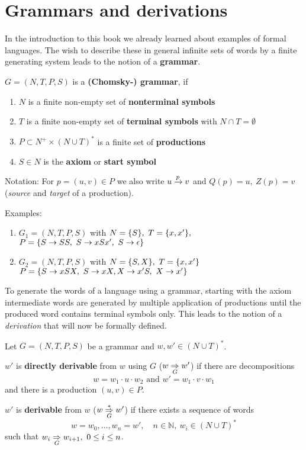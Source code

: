 \section{Grammars and derivations}

In the introduction to this book we already learned about examples of formal
languages. The wish to describe these in general infinite sets of words by a
finite generating system leads to the notion of a {\bf grammar}.

\begin{definition}
$G = (N, T, P, S)$ is a {\bf (Chomsky-) grammar}, if
\begin{enumerate}
  \item $N$ is a finite non-empty set of {\bf nonterminal symbols}
  \item $T$ is a finite non-empty set of {\bf terminal symbols} with
  $N \cap T = \emptyset$
  \item $P \subset N^+ \times (N \cup T)^*$ is a finite set of {\bf productions}
  \item $S \in N$ is the {\bf axiom} or {\bf start symbol} 
\end{enumerate}
\end{definition}

Notation: For $p = (u, v) \in P$ we also write $u \xrightarrow{{p}} v$ and
$Q(p) = u,\ Z(p) = v$ ({\em source} and {\em target} of a production).

Examples:
\begin{enumerate}
  \item $G_1 = (N, T, P, S)$ with $N = \mbox{$\{S\}$},\ T = \mbox{$\{x, x'\}$},$ \\ 
  $P = \mbox{$\{S \to SS,\ S \to xSx',\ S \to \epsilon\}$}$
  \item $G_2 = (N, T, P, S)$ with $N = \mbox{$\{S, X\}$},\ T = \mbox{$\{x, x'\}$}$ \\
  $P = \setof{S \to xSX,\ S \to xX, X \to x'S,\ X \to x'}$
\end{enumerate}

To generate the words of a language using a grammar, starting with the axiom
intermediate words are generated by multiple application of productions
until the produced word contains terminal symbols only. This leads to the
notion of a {\em derivation} that will now be formally defined.

\begin{definition}
Let $G = (N, T, P, S)$ be a grammar and $w, w' \in (N \cup T)^*$.

$w'$ is {\bf directly derivable} from $w$ using $G$ ($w \underset{G}{\Rightarrow} w'$) if
there are decompositions 
\[ w = w_1 \cdot u \cdot w_2\text{ and }w' = w_1 \cdot v \cdot w_1 \]
and there is a production $(u, v) \in P$.

$w'$ is {\bf derivable} from $w$ ($w \underset{{G}}{\overset{*}{\Rightarrow}} w'$) if there exists
a sequence of words 
\[ w = w_0, \ldots, w_n = w',\quad n \in \mathbb{N},\ w_i \in (N \cup T)^* \]
such that $w_i \underset{G}{\Rightarrow} w_{i+1},\ 0 \leq i \leq n$.
\end{definition}

